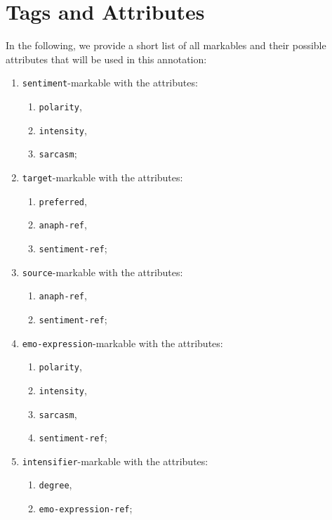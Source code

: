\documentclass[11pt,a4paper]{article}
\theoremstyle{mytheoremstyle}
\begin{document}

\section{Tags and Attributes}\label{sec:markables}
In the following, we provide a short list of all markables and their possible
attributes that will be used in this annotation:

\begin{multicols}{2}
  \begin{enumerate}
  \item \texttt{sentiment}-markable with the attributes:
    \begin{enumerate}
    \item \texttt{polarity},
    \item \texttt{intensity},
    \item \texttt{sarcasm};
    \end{enumerate}
  \item \texttt{target}-markable with the attributes:
    \begin{enumerate}
    \item \texttt{preferred},
    \item \texttt{anaph-ref},
    \item \texttt{sentiment-ref};
    \end{enumerate}
  \item \texttt{source}-markable with the attributes:
    \begin{enumerate}
    \item \texttt{anaph-ref},
    \item \texttt{sentiment-ref};
    \end{enumerate}
  \item \texttt{emo-expression}-markable with the attributes:
    \begin{enumerate}
    \item \texttt{polarity},
    \item \texttt{intensity},
    \item \texttt{sarcasm},
    \item \texttt{sentiment-ref};
    \end{enumerate}
  \item \texttt{intensifier}-markable with the attributes:
    \begin{enumerate}
    \item \texttt{degree},
    \item \texttt{emo-expression-ref};

\end{enumerate}
\end{enumerate}
\end{multicols}
\end{document}
